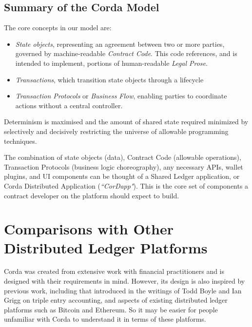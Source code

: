 \documentclass{article}
\begin{document}
\subsection{Summary of the Corda Model}
The core concepts in our model are:
\begin{itemize}

\item \textit{State objects}, representing an agreement between two or more parties, governed by machine-readable \textit{Contract Code}. This code references, and is intended to implement, portions of human-readable \textit{Legal Prose}. \item \textit{Transactions}, which transition state objects through a lifecycle
\item \textit{Transaction Protocols} or \textit{Business Flow}, enabling parties to coordinate actions without a central controller.
\end{itemize}

Determinism is maximised and the amount of shared state required minimized by selectively and decisively restricting the universe of allowable programming techniques.

The combination of state objects (data), Contract Code (allowable operations), Transaction Protocols (business logic choreography), any necessary APIs, wallet plugins, and UI components can be thought of a Shared Ledger application, or Corda Distributed Application (\textit{``CorDapp"}). This is the core set of components a contract developer on the platform should expect to build. 



\section{Comparisons with Other Distributed Ledger Platforms}
Corda was created from extensive work with financial practitioners and is designed with their requirements in mind. However, its design is also inspired by previous work, including that introduced in the writings of Todd Boyle and Ian Grigg on triple entry accounting\cite{Triple}, and aspects of existing distributed ledger platforms such as Bitcoin\cite{Bitcoin} and Ethereum\cite{Ethereum}. So it may be easier for people unfamiliar with Corda to understand it in terms of these platforms. 
\end{document}
